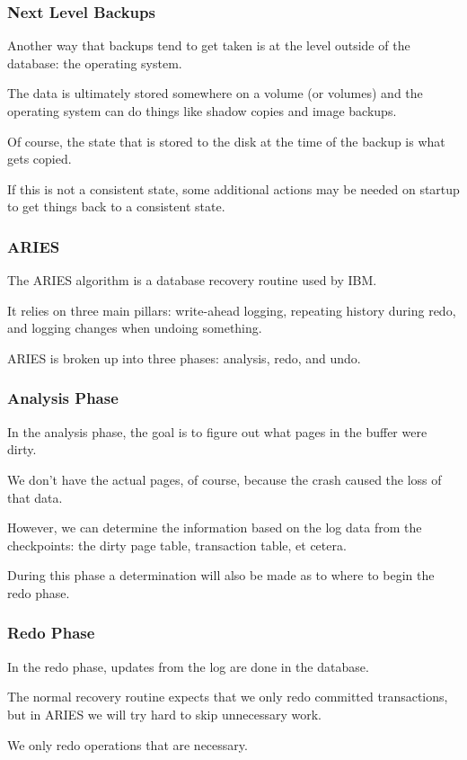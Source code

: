 \begin{frame}
\frametitle{Next Level Backups}

Another way that backups tend to get taken is at the level outside of the database: the operating system. 

The data is ultimately stored somewhere on a volume (or volumes) and the operating system can do things like shadow copies and image backups. 

Of course, the state that is stored to the disk at the time of the backup is what gets copied. 

If this is not a consistent state, some additional actions may be needed on startup to get things back to a consistent state.


\end{frame}


\begin{frame}
\frametitle{ARIES}

The ARIES algorithm is a database recovery routine used by IBM. 

It relies on three main pillars: write-ahead logging, repeating history during redo, and logging changes when undoing something.

ARIES is broken up into three phases: analysis, redo, and undo.


\end{frame}


\begin{frame}
\frametitle{Analysis Phase}

In the analysis phase, the goal is to figure out what pages in the buffer were dirty. 

We don't have the actual pages, of course, because the crash caused the loss of that data. 

However, we can determine the information based on the log data from the checkpoints: the dirty page table, transaction table, et cetera. 

During this phase a determination will also be made as to where to begin the redo phase.


\end{frame}


\begin{frame}
\frametitle{Redo Phase}

In the redo phase, updates from the log are done in the database. 

The normal recovery routine expects that we only redo committed transactions, but in ARIES we will try hard to skip unnecessary work. 

We only redo operations that are necessary.


\end{frame}


